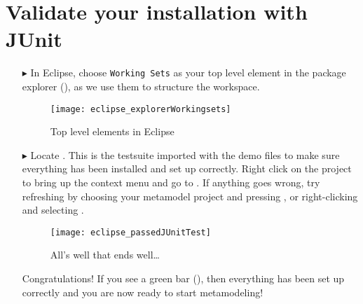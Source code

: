 \clearpage
\genHeader
\hypertarget{validate common}{} 
\section{Validate your installation with JUnit}

\begin{itemize}

\item[$\blacktriangleright$] In Eclipse, choose \texttt{Working Sets} as your top level element in the package explorer (), as we use them to structure the workspace.

\begin{figure}[htbp]
	\centering
  \texttt{[image: eclipse\_explorerWorkingsets]}
	\caption{Top level elements in Eclipse}
	\label{eclipse:topLevel}
\end{figure}

\item[$\blacktriangleright$]
Locate .
This is the testsuite imported with the demo files to make sure everything has been installed and set up correctly.
Right click on the project to bring up the context menu and go to .
If anything goes wrong, try refreshing by choosing your metamodel project and pressing , or right-clicking and selecting .

\begin{figure}[htbp]
	\centering
  \texttt{[image: eclipse\_passedJUnitTest]}
	\caption{All's well that ends well\ldots}
	\label{eclipse:passedTest}
\end{figure}

\vspace{0.5cm}

Congratulations!
If you see a green bar (), then everything has been set up correctly and you are now ready to start metamodeling!

\end{itemize}